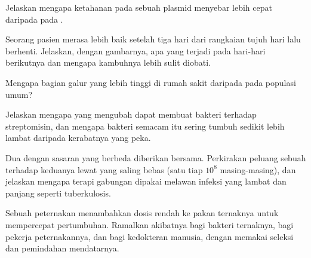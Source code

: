 \begin{exercise}[$\star\star$]\label{exo:g11:antibiotic-resistance:8}
Jelaskan mengapa  ketahanan pada sebuah plasmid menyebar lebih cepat
daripada  pada .
\end{exercise}

\begin{exercise}[$\star\star$]\label{exo:g11:antibiotic-resistance:9}
Seorang pasien merasa lebih baik setelah tiga hari dari rangkaian tujuh
hari lalu berhenti. Jelaskan, dengan gambarnya, apa yang terjadi pada
hari-hari berikutnya dan mengapa kambuhnya lebih sulit diobati.
\end{exercise}

\begin{exercise}[$\star\star$]\label{exo:g11:antibiotic-resistance:10}
Mengapa bagian galur yang  lebih tinggi di rumah sakit daripada
pada populasi umum?
\end{exercise}

\begin{exercise}[$\star\star$]\label{exo:g11:antibiotic-resistance:11}
Jelaskan mengapa  yang mengubah   dapat membuat
bakteri  terhadap streptomisin, dan mengapa bakteri semacam itu
sering tumbuh sedikit lebih lambat daripada kerabatnya yang peka.
\end{exercise}

\begin{exercise}[$\star\star\star$]\label{exo:g11:antibiotic-resistance:12}
Dua  dengan sasaran yang berbeda diberikan bersama.
Perkirakan peluang sebuah   terhadap keduanya lewat  yang
saling bebas (satu tiap $10^8$ masing-masing), dan jelaskan mengapa
terapi gabungan dipakai melawan infeksi yang lambat dan panjang seperti
tuberkulosis.
\end{exercise}

\begin{exercise}[$\star\star\star$]\label{exo:g11:antibiotic-resistance:13}
Sebuah peternakan menambahkan  dosis rendah ke pakan
ternaknya untuk mempercepat pertumbuhan. Ramalkan akibatnya bagi
bakteri ternaknya, bagi pekerja peternakannya, dan bagi kedokteran
manusia, dengan memakai seleksi dan pemindahan mendatarnya.
\end{exercise}

